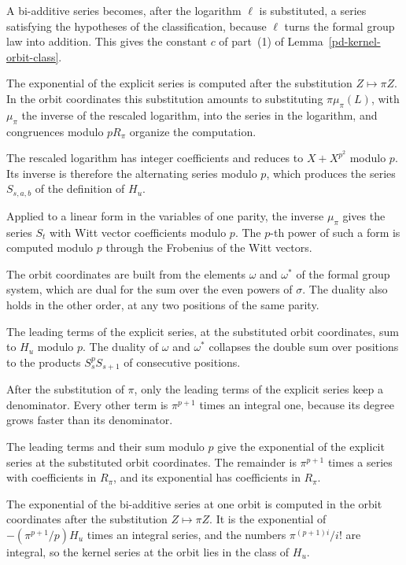 A bi-additive series becomes, after the logarithm $\ell$ is substituted, a series satisfying the
hypotheses of the classification, because $\ell$ turns the formal group law into addition. This gives
the constant $c$ of part~(1) of Lemma~\ref{pd-kernel-orbit-class}.

The exponential of the explicit series is computed after the substitution $Z\mapsto\pi Z$. In the orbit
coordinates this substitution amounts to substituting $\pi\mu_\pi(L)$, with $\mu_\pi$ the inverse of the
rescaled logarithm, into the series in the logarithm, and congruences modulo $pR_\pi$ organize the
computation.

The rescaled logarithm has integer coefficients and reduces to $X+X^{p^2}$ modulo $p$. Its inverse is
therefore the alternating series modulo $p$, which produces the series $S_{s,a,b}$ of the definition of
$H_u$.

Applied to a linear form in the variables of one parity, the inverse $\mu_\pi$ gives the series $S_t$
with Witt vector coefficients modulo $p$. The $p$-th power of such a form is computed modulo $p$ through
the Frobenius of the Witt vectors.

The orbit coordinates are built from the elements $\omega$ and $\omega^*$ of the formal group system,
which are dual for the sum over the even powers of $\sigma$. The duality also holds in the other order, at
any two positions of the same parity.

The leading terms of the explicit series, at the substituted orbit coordinates, sum to $H_u$ modulo $p$.
The duality of $\omega$ and $\omega^*$ collapses the double sum over positions to the products
$S_s^pS_{s+1}$ of consecutive positions.

After the substitution of $\pi$, only the leading terms of the explicit series keep a denominator. Every
other term is $\pi^{p+1}$ times an integral one, because its degree grows faster than its denominator.

The leading terms and their sum modulo $p$ give the exponential of the explicit series at the substituted
orbit coordinates. The remainder is $\pi^{p+1}$ times a series with coefficients in $R_\pi$, and its
exponential has coefficients in $R_\pi$.

The exponential of the bi-additive series at one orbit is computed in the orbit coordinates after the
substitution $Z\mapsto\pi Z$. It is the exponential of $-(\pi^{p+1}/p)H_u$ times an integral series, and
the numbers $\pi^{(p+1)i}/i!$ are integral, so the kernel series at the orbit lies in the class of $H_u$.

